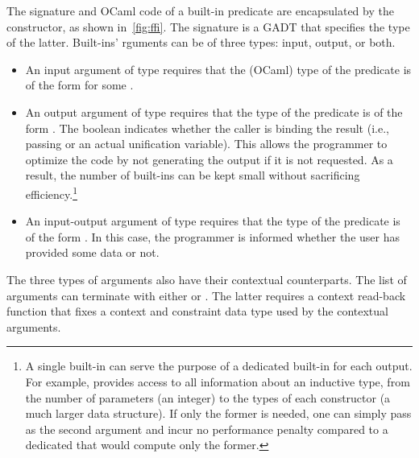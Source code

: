 \documentclass[a4paper, 11pt]{book}
\begin{document}
The signature and OCaml code of a built-in predicate are encapsulated by the
 constructor, as shown in~\cref{fig:ffi}. The signature is a GADT that
specifies the type of the latter. Built-ins' rguments can be of three types: input,
output, or both.
\begin{itemize}
\item
An input argument of type  requires that the (OCaml) type of the predicate
 is of the form  for some .\\
\item
An output argument of type  requires that the type of the predicate
 is of the form . The boolean indicates
whether the caller is binding the result (i.e., passing \elpi{_} or an actual unification variable). This allows
the programmer to optimize the code by not generating the output if it is not
requested. As a result, the number of built-ins can be kept small without
sacrificing efficiency.\footnote{A single built-in can serve the purpose of a
dedicated built-in for each output. For example,  provides
access to all information about an inductive type, from the number of
parameters (an integer) to the types of each constructor (a much larger data
structure). If only the former is needed, one can simply pass \elpi{_} as the
second argument and incur no performance penalty compared to a dedicated
 that would compute only the former.}\\
\item
An input-output argument of type  requires that the type of the
predicate  is of the form . In this
case, the programmer is informed whether the user has provided some data or
not.
\end{itemize}

\noindent
The three types of arguments also have their contextual counterparts. The list
of arguments can terminate with either  or . The
latter requires a context read-back function that fixes a context and
constraint data type used by the contextual arguments.
\end{document}
